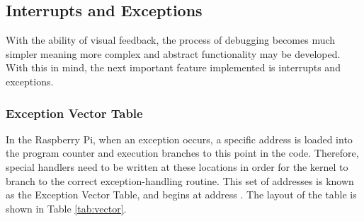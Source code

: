 \subsection{Interrupts and Exceptions}
    With the ability of visual feedback, the process of debugging becomes much
    simpler meaning more complex and abstract functionality may be developed.
    With this in mind, the next important feature implemented is interrupts and
    exceptions.

    \subsubsection{Exception Vector Table}
        In the Raspberry Pi, when an exception occurs, a specific address is
        loaded into the program counter and execution branches to this point in
        the code. Therefore, special handlers need to be written at these
        locations in order for the kernel to branch to the correct
        exception-handling routine. This set of addresses is known as the
        Exception Vector Table, and begins at address . The layout of
        the table \cite[pg.~A2-16]{ARMARM} is shown in Table \ref{tab:vector}.
